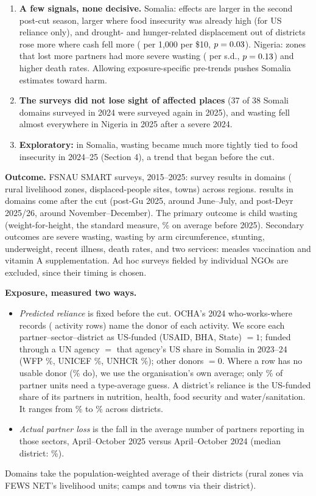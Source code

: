 \documentclass[11pt]{article}
\newcommand{\hd}[1]{\par\medskip{\sffamily\large\bfseries\color{navy}#1}\par}
\begin{document}
\begin{enumerate}
  \item \textbf{A few signals, none decisive.} Somalia: effects are larger in the second post-cut season, larger where food insecurity was already high (for US reliance only), and drought- and hunger-related displacement out of districts rose more where cash fell more (\ndpBOutCash{} per 1,000 per \$10, $p=0.03$). Nigeria: zones that lost more partners had more severe wasting (\nngBLossSam{} per s.d., $p=0.13$) and higher death rates. Allowing exposure-specific pre-trends pushes Somalia estimates toward harm.
  \item \textbf{The surveys did not lose sight of affected places} (37 of 38 Somali domains surveyed in 2024 were surveyed again in 2025), and wasting fell almost everywhere in Nigeria in 2025 after a severe 2024.
  \item \textbf{Exploratory:} in Somalia, wasting became much more tightly tied to food insecurity in 2024--25 (Section 4), a trend that began before the cut.
\end{enumerate}

\hd{1. Design}
\textbf{Outcome.} FSNAU SMART surveys, 2015--2025: \nRows{} survey results in \nDomains{} domains (\nDomRural{} rural livelihood zones, \nDomIdp{} displaced-people sites, \nDomUrban{} towns) across \nRegions{} regions. \nPostRows{} results in \nPostDomains{} domains come after the cut (post-Gu 2025, around June--July, and post-Deyr 2025/26, around November--December). The primary outcome is child wasting (weight-for-height, the standard measure, \nYmeanPredGam\% on average before 2025). Secondary outcomes are severe wasting, wasting by arm circumference, stunting, underweight, recent illness, death rates, and two services: measles vaccination and vitamin A supplementation. Ad hoc surveys fielded by individual NGOs are excluded, since their timing is chosen.

\textbf{Exposure, measured two ways.}
\begin{itemize}
  \item \emph{Predicted reliance} is fixed before the cut. OCHA's 2024 who-works-where records (\nDonorRows{} activity rows) name the donor of each activity. We score each partner--sector--district as US-funded (USAID, BHA, State) $=1$; funded through a UN agency $=$ that agency's US share in Somalia in 2023--24 (WFP \nWfpUs\%, UNICEF \nUnicefUs\%, UNHCR \nUnhcrUs\%); other donors $=0$. Where a row has no usable donor (\nDonorInfo\% do), we use the organisation's own average; only \nUnitsImputed\% of \nUnits{} partner units need a type-average guess. A district's reliance is the US-funded share of its partners in nutrition, health, food security and water/sanitation. It ranges from \nEpredMin\% to \nEpredMax\% across \nDistricts{} districts.
  \item \emph{Actual partner loss} is the fall in the average number of partners reporting in those sectors, April--October 2025 versus April--October 2024 (median district: \nElossMed\%).
\end{itemize}
Domains take the population-weighted average of their districts (rural zones via FEWS NET's livelihood units; camps and towns via their district).
\end{document}
